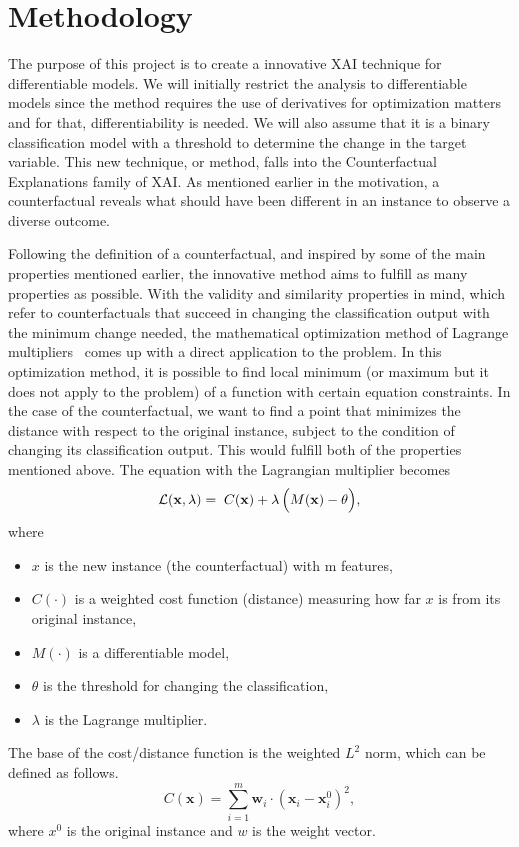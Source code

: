\documentclass[12pt]{extarticle}
\numberwithin{equation}{section}
\begin{document}
\section{Methodology}\label{sec:methodology}
The purpose of this project is to create a innovative XAI technique for differentiable models. We will initially restrict the analysis to differentiable models since the method requires the use of derivatives for optimization matters and for that, differentiability is needed. We will also assume that it is a binary classification model with a threshold to determine the change in the target variable. This new technique, or method, falls into the Counterfactual Explanations family of XAI. As mentioned earlier in the motivation, a counterfactual reveals what should have been different in an instance to observe a diverse outcome.

Following the definition of a counterfactual, and inspired by some of the main properties mentioned earlier, the innovative method aims to fulfill as many properties as possible. With the validity and similarity properties in mind, which refer to counterfactuals that succeed in changing the classification output with the minimum change needed, the mathematical optimization method of Lagrange multipliers~\cite{lagrange} comes up with a direct application to the problem. In this optimization method, it is possible to find local minimum (or maximum but it does not apply to the problem) of a function with certain equation constraints. In the case of the counterfactual, we want to find a point that minimizes the distance with respect to the original instance, subject to the condition of changing its classification output. This would fulfill both of the properties mentioned above. The equation with the Lagrangian multiplier becomes
\begin{equation}\label{eq:lagrange}
\mathcal{L}(\mathbf{x}, \lambda) = \; C(\mathbf{x}) + \lambda \, \Bigl(M(\mathbf{x}) - \theta \Bigr),
\end{equation}
where
\begin{itemize}
  \item $x$ is the new instance (the counterfactual) with m features,
  \item $C(\cdot)$ is a weighted cost function (distance) measuring how far $x$ is from its original instance,
  \item $M(\cdot)$ is a differentiable model, 
  \item $\theta$ is the threshold for changing the classification,
  \item $\lambda$ is the Lagrange multiplier.
\end{itemize}
The base of the cost/distance function is the weighted $L^2$ norm, which can be defined as follows.
\begin{equation}\label{eq:cost}
    C(\mathbf{x}) = \sum_{i=1}^{m} \mathbf{w}_i \cdot (\mathbf{x}_i - \mathbf{x}^0_{i})^2,
\end{equation}
where $x^0$ is the original instance and $w$ is the weight vector.
\end{document}
